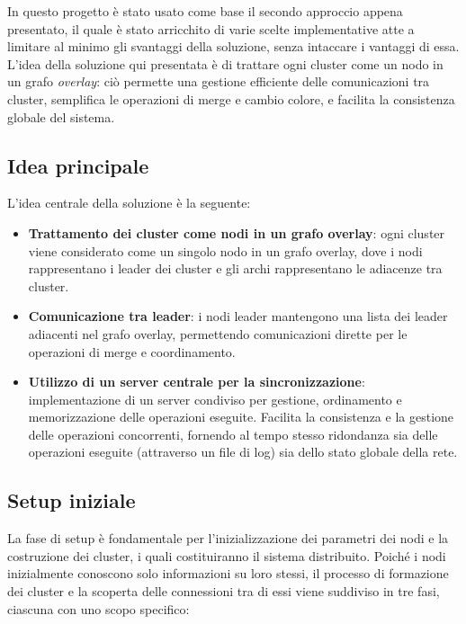\documentclass[12pt, a4paper]{report}
\begin{document}
In questo progetto \`e stato usato come base il secondo approccio appena presentato, il quale \`e stato arricchito di varie scelte implementative atte a limitare al minimo gli svantaggi della soluzione, senza intaccare i vantaggi di essa. L'idea della soluzione qui presentata \`e di trattare ogni cluster come un nodo in un grafo \emph{overlay}: ci\`o permette una gestione efficiente delle comunicazioni tra cluster, semplifica le operazioni di merge e cambio colore, e facilita la consistenza globale del sistema.

\subsection{Idea principale}

L'idea centrale della soluzione \`e la seguente:

\begin{itemize}
    \item \textbf{Trattamento dei cluster come nodi in un grafo overlay}: ogni cluster viene considerato come un singolo nodo in un grafo overlay, dove i nodi rappresentano i leader dei cluster e gli archi rappresentano le adiacenze tra cluster.
    \item \textbf{Comunicazione tra leader}: i nodi leader mantengono una lista dei leader adiacenti nel grafo overlay, permettendo comunicazioni dirette per le operazioni di merge e coordinamento.
    \item \textbf{Utilizzo di un server centrale per la sincronizzazione}: implementazione di un server condiviso per gestione, ordinamento e memorizzazione delle operazioni eseguite. Facilita la consistenza e la gestione delle operazioni concorrenti, fornendo al tempo stesso ridondanza sia delle operazioni eseguite (attraverso un file di log) sia dello stato globale della rete.
\end{itemize}

\subsection{Setup iniziale}

La fase di setup \`e fondamentale per l'inizializzazione dei parametri dei nodi e la costruzione dei cluster, i quali costituiranno il sistema distribuito. Poiché i nodi inizialmente conoscono solo informazioni su loro stessi, il processo di formazione dei cluster e la scoperta delle connessioni tra di essi viene suddiviso in tre fasi, ciascuna con uno scopo specifico:
\end{document}

